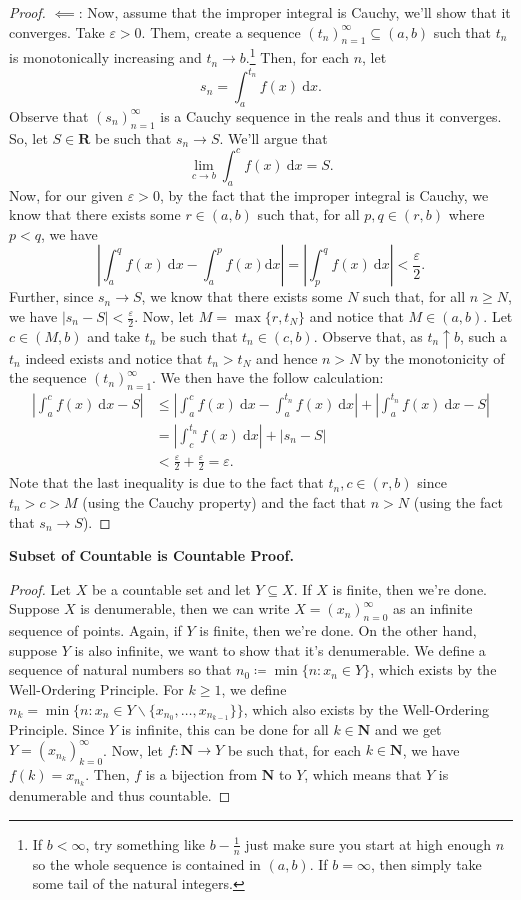 \documentclass[11pt]{article} %
\theoremstyle{plain}
\newcommand{\R}{\mathbf{R}}
\newcommand{\N}{\mathbf{N}}
\begin{document}
\begin{proof}
$\impliedby$: Now, assume that the improper integral is Cauchy, we'll show that it converges. Take $\varepsilon>0$. Them, create a sequence $(t_n)_{n=1}^\infty \subseteq (a,b)$ such that $t_n$ is monotonically increasing and $t_n \to b$.\footnote{If $b<\infty$, try something like $b-\frac1n$ just make sure you start at high enough $n$ so the whole sequence is contained in $(a,b)$. If $b=\infty$, then simply take some tail of the natural integers.} Then, for each $n$, let
\[s_n = \int_a^{t_n} f(x)\ \mathrm{d}x.\]
Observe that $(s_n)_{n=1}^\infty$ is a Cauchy sequence in the reals and thus it converges. So, let $S\in \R$ be such that $s_n\to S$. We'll argue that
\[\lim_{c\to b}\int_a^c f(x)\ \mathrm{d}x = S.\]
Now, for our given $\varepsilon>0$, by the fact that the improper integral is Cauchy, we know that there exists some $r\in(a,b)$ such that, for all $p,q\in(r,b)$ where $p<q$, we have
\[\left|\int_a^q f(x)\ \mathrm{d}x- \int_a^p f(x) \mathrm{d}x\right| = \left|\int_p^q f(x)\ \mathrm{d}x\right| < \frac{\varepsilon}{2}.\]
Further, since $s_n\to S$, we know that there exists some $N$ such that, for all $n\geq N$, we have $|s_n-S|<\frac{\varepsilon}{2}$. Now, let $M = \max\{r, t_N\}$ and notice that $M\in(a,b)$. Let $c\in(M,b)$ and take $t_n$ be such that $t_n\in(c,b)$. Observe that, as $t_n\uparrow b$, such a $t_n$ indeed exists and notice that $t_n > t_N$ and hence $n>N$ by the monotonicity of the sequence $(t_n)_{n=1}^\infty$. We then have the follow calculation:
\begin{align*}
\left|\int_a^c f(x)\ \mathrm{d}x -S\right| & \leq \left|\int_a^c f(x)\ \mathrm{d}x -\int_a^{t_n}f(x)\ \mathrm{d}x\right|+\left|\int_a^{t_n}f(x)\ \mathrm{d}x -S\right| \\
& = \left|\int_c^{t_n} f(x) \ \mathrm{d}x\right| + |s_n-S| \\
& < \frac{\varepsilon}{2} +\frac{\varepsilon}{2} = \varepsilon.
\end{align*}
Note that the last inequality is due to the fact that $t_n,c\in(r,b)$ since $t_n>c>M$ (using the Cauchy property) and the fact that $n>N$ (using the fact that $s_n\to S$).
\end{proof}

\textbf{Subset of Countable is Countable Proof.}

\begin{proof}
Let $X$ be a countable set and let $Y\subseteq X$. If $X$ is finite, then we're done. Suppose $X$ is denumerable, then we can write $X = (x_n)_{n=0}^\infty$ as an infinite sequence of points. Again, if $Y$ is finite, then we're done. On the other hand, suppose $Y$ is also infinite, we want to show that it's denumerable. We define a sequence of natural numbers so that $n_0 \coloneqq  \min\{n : x_n\in Y\}$, which exists by the Well-Ordering Principle. For $k\geq 1$, we define $n_k = \min\{n : x_n\in Y \backslash \{x_{n_0},\ldots,x_{n_{k-1}}\} \}$, which also exists by the Well-Ordering Principle. Since $Y$ is infinite, this can be done for all $k\in \N$ and we get $Y= (x_{n_k})_{k=0}^\infty$. Now, let $f:\N\to Y$ be such that, for each $k\in \N$, we have $f(k) = x_{n_k}$. Then, $f$ is a bijection from $\N$ to $Y$, which means that $Y$ is denumerable and thus countable.
\end{proof}
\end{document}
